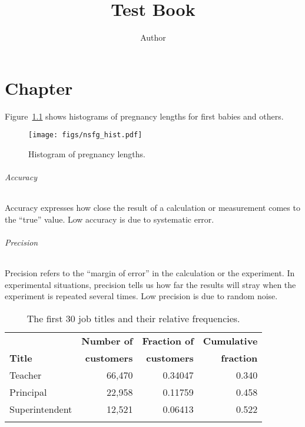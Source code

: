\documentclass{book}
\title{Test Book}
\author{Author}
\newif\ifplastex
\begin{document}
\frontmatter

\ifplastex
    \usepackage{localdef}
    \maketitle

\else

\fi

\chapter{Chapter}

\newcommand{\tbl}[2]{#2\caption{#1}}

Figure~\ref{nsfg_hist} shows histograms of pregnancy lengths for
first babies and others.

\begin{figure}
\centerline{\texttt{[image: figs/nsfg\_hist.pdf]}}
\caption{Histogram of pregnancy lengths.}
\label{nsfg_hist}
\end{figure}

\begin{unnumlist}
\subparagraph{Accuracy}
\item {} Accuracy expresses how close the result of a calculation
  or measurement comes to the ``true'' value. Low accuracy is due to
  systematic error.
\subparagraph{Precision}  
\item Precision refers to the ``margin of error''  in the 
  calculation or the experiment. In experimental situations, precision
  tells us how far the results will stray when the experiment is 
  repeated several times. Low precision is due to random noise.
\end{unnumlist}


\begin{table}
\tbl{The first 30 job titles and their relative frequencies.\label{tbl:jobtitles}}{%
\begin{tabular}{lrrr}
\toprule
   & \textbf{Number of}
   & \textbf{Fraction of}
  & \textbf{Cumulative} \\
\textbf{Title} &  \textbf{customers} & \textbf{customers} & \textbf{fraction}\\
\colrule
Teacher \rule{0mm}{4mm}  & 66,470  &  0.34047   &   0.340 \\ 
Principal                & 22,958  &  0.11759   &   0.458 \\
Superintendent           & 12,521  &  0.06413   &   0.522 \\
\botrule
\end{tabular}}
\end{table}
\end{document}

